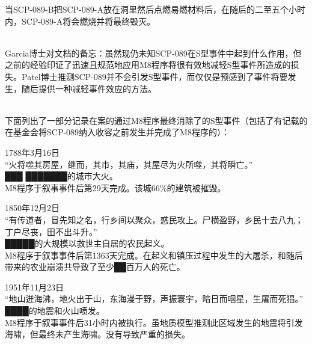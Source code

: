 当SCP-089-B把SCP-089-A放在洞里然后点燃易燃材料后，在随后的二至五个小时内，SCP-089-A将会燃烧并将最终毁灭。

\\
Garcia博士对文档的备忘：虽然现仍未知SCP-089在S型事件中起到什么作用，但之前的经验印证了迅速且规范地应用M8程序将很有效地减轻S型事件所造成的损失。Patel博士推测SCP-089并不会引发S型事件，而仅仅是预感到了事件将要发生，随后提供一种减轻事件效应的方法。

\\
下面列出了一部分记录在案的通过M8程序最终消除了的S型事件（包括了有记载的在基金会将SCP-089纳入收容之前发生并完成了M8程序的）：

\begin{scpbox}

1788年3月16日\\
“火将噬其房屋，继而，其市，其庙，其屋尽为火所噬，其将瞬亡。”\\
███ ███████的城市大火。\\
M8程序于叙事事件后第29天完成。该城66\%的建筑被摧毁。

\end{scpbox}

\begin{scpbox}

1850年12月2日\\
“有传道者，冒先知之名，行乡间以聚众，惑民攻上。尸横盈野，乡民十去八九；丁户尽丧，田不出斗升。”\\
█████的大规模以救世主自居的农民起义。\\
M8程序于叙事事件后第1363天完成。在起义和镇压过程中发生的大屠杀，和随后带来的农业崩溃共导致了至少██百万人的死亡。

\end{scpbox}

\begin{scpbox}

1951年11月23日\\
“地山迸海沸，地火出于山，东海漫于野，声振寰宇，暗日而咽星，生屠而死猖。”\\
████的地震和火山喷发。\\
M8程序于叙事事件后31小时内被执行。虽地质模型推测此区域发生的地震将引发海啸，但最终未产生海啸。没有导致严重的损失。

\end{scpbox}

